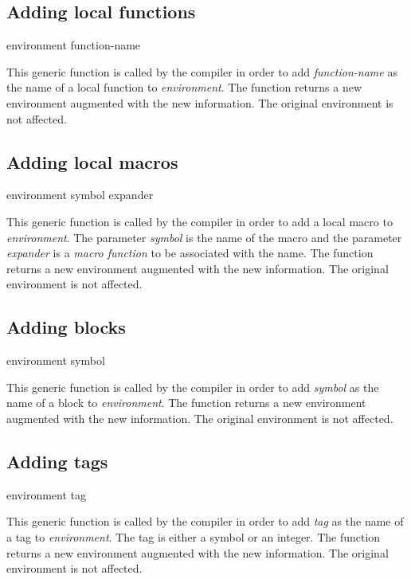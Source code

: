 \subsection{Adding local functions}

 {environment function-name}

This generic function is called by the compiler in order to add
\textit{function-name} as the name of a local function to
\textit{environment}.  The function returns a new environment
augmented with the new information.  The original environment is not
affected.

\subsection{Adding local macros}

 {environment symbol expander}

This generic function is called by the compiler in order to add a
local macro to \textit{environment}.  The parameter \textit{symbol} is
the name of the macro and the parameter \textit{expander} is a
\emph{macro function} to be associated with the name.  The function
returns a new environment augmented with the new information.  The
original environment is not affected.

\subsection{Adding blocks}

 {environment symbol}

This generic function is called by the compiler in order to add
\textit{symbol} as the name of a block to \textit{environment}.  The
function returns a new environment augmented with the new information.
The original environment is not affected.

\subsection{Adding tags}

 {environment tag}

This generic function is called by the compiler in order to add
\textit{tag} as the name of a tag to \textit{environment}.  The tag is
either a symbol or an integer.  The function returns a new environment
augmented with the new information.  The original environment is not
affected.


